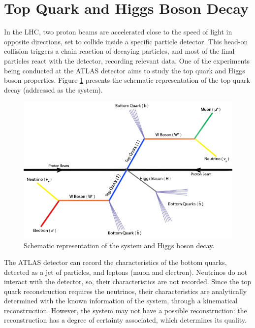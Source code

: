 \section{Top Quark and Higgs Boson Decay}
\label{problem_and_app}

In the LHC, two proton beams are accelerated close to the speed of light in opposite directions, set to collide inside a specific particle detector. This head-on collision triggers a chain reaction of decaying particles, and most of the final particles react with the detector, recording relevant data. One of the experiments being conducted at the ATLAS detector aims to study the top quark and Higgs boson properties\cite{Higgs}. Figure \ref{fig:ttbar} presents the schematic representation of the top quark decay (addressed as the \ttbar system).

\begin{figure}[!htp]
	\begin{center}
		\includegraphics[scale=0.45]{images/ttbar_higgs.png}
		\caption{Schematic representation of the \ttbar system and Higgs boson decay.}
		\label{fig:ttbar}
	\end{center}
\end{figure}

The ATLAS detector can record the characteristics of the bottom quarks, detected as a jet of particles, and leptons (muon and electron). Neutrinos do not interact with the detector, so, their characteristics are not recorded. Since the top quark reconstruction requires the neutrinos, their characteristics are analytically determined with the known information of the system, through a kinematical reconstruction. However, the \ttbar system may not have a possible reconstruction: the reconstruction has a degree of certainty associated, which determines its quality.

